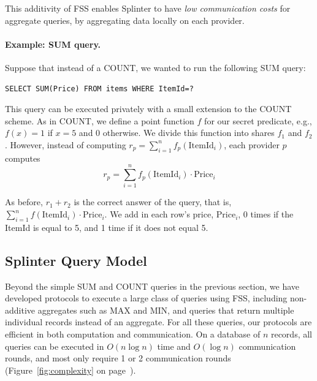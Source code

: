 This additivity of FSS enables Splinter
to have \textit{low communication costs} for aggregate queries, by aggregating
data locally on each provider.

\paragraph{Example: SUM query.}
Suppose that instead of a COUNT, we wanted to run the following SUM query:
\begin{verbatim}
SELECT SUM(Price) FROM items WHERE ItemId=?
\end{verbatim}

This query can be executed privately with a small extension to the COUNT scheme.
As in COUNT, we define a point function $f$ for our secret predicate, e.g.,
$f(x)=1$ if $x=5$ and 0 otherwise.
We divide this function into shares $f_1$ and $f_2$.
However, instead of computing
$r_p = \sum_{i=1}^n f_p(\mathrm{ItemId}_i)$,
each provider $p$ computes
$$r_p = \sum_{i=1}^n f_p(\mathrm{ItemId}_i) \cdot \mathrm{Price}_i$$

As before, $r_1 + r_2$ is the correct answer of the query,
that is, $\sum_{i=1}^n f(\mathrm{ItemId}_i) \cdot \mathrm{Price}_i$.
We add in each row's price, $\mathrm{Price}_i$, 0 times if the ItemId is equal to 5,
and 1 time if it does not equal 5.

\subsection{Splinter Query Model}
\label{sec:querymodel}

Beyond the simple SUM and COUNT queries in the previous section, 
we have developed
protocols to execute a large class of queries using FSS, including
non-additive aggregates such as MAX and MIN, and queries that return multiple
individual records instead of an aggregate.
For all these queries, our protocols are efficient in both
computation and communication.
On a database of $n$ records, all queries can be executed in $O(n \log n)$ time
and $O(\log n)$ communication rounds, and most only require 1 or 2 communication rounds
(Figure~\ref{fig:complexity} on page~\pageref{fig:complexity}).

